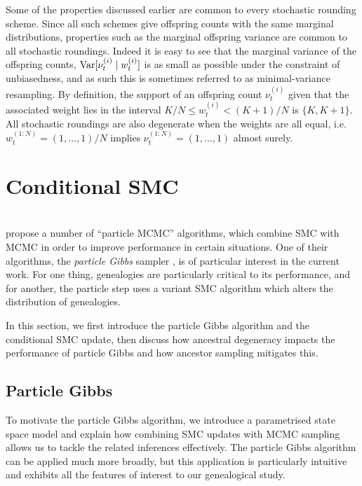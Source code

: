 Some of the properties discussed earlier are common to every stochastic rounding scheme. 
Since all such schemes give offspring counts with the same marginal distributions, properties such as the marginal offspring variance are common to all stochastic roundings. Indeed it is easy to see that the marginal variance of the offspring counts, $\operatorname{Var}[ \nu_t^{(i)} \mid w_t^{(i)} ]$ is as small as possible under the constraint of unbiasedness, and as such this is sometimes referred to as minimal-variance resampling.
By definition, the support of an offspring count $\nu_t^{(i)}$ given that the associated weight lies in the interval $K/N \leq w_t^{(i)} < (K+1)/N$ is $\{ K, K+1\}$. 
All stochastic roundings are also degenerate when the weights are all equal, i.e.\ $w_t^{(1:N)} = (1,\dots, 1)/N$ implies $\nu_t^{(1:N)}=(1,\dots,1)$ almost surely.





\section{Conditional SMC}
\label{sec:condSMC}
\\
\textcite{andrieu2010} propose a number of ``particle MCMC'' algorithms, which combine SMC with MCMC in order to improve performance in certain situations.
One of their algorithms, the \emph{particle Gibbs} sampler \parencite[Section 2.4.3]{andrieu2010}, is of particular interest in the current work. For one thing, genealogies are particularly critical to its performance, and for another, the particle step uses a variant SMC algorithm which alters the distribution of genealogies.

In this section, we first introduce the particle Gibbs algorithm and the conditional SMC update, then discuss how ancestral degeneracy impacts the performance of particle Gibbs and how ancestor sampling mitigates this.




\subsection{Particle Gibbs}
To motivate the particle Gibbs algorithm, we introduce a parametrised state space model and explain how combining SMC updates with MCMC sampling allows us to tackle the related inferences effectively.
The particle Gibbs algorithm can be applied much more broadly, but this application is particularly intuitive and exhibits all the features of interest to our genealogical study.

